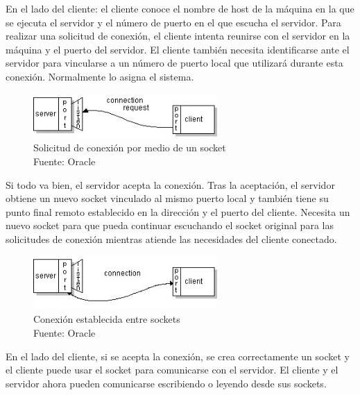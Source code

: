 En el lado del cliente: el cliente conoce el nombre de host de la máquina en la que se ejecuta el servidor y el número de puerto en el que escucha el servidor. Para realizar una solicitud de conexión, el cliente intenta reunirse con el servidor en la máquina y el puerto del servidor. El cliente también necesita identificarse ante el servidor para vincularse a un número de puerto local que utilizará durante esta conexión. Normalmente lo asigna el sistema.

\begin{figure}[H]
    \begin{center}
        \includegraphics[width=7cm]{img/capitulo_2/socket_request.jpg}
    \end{center}
    \caption{Solicitud de conexión por medio de un socket\\Fuente: Oracle}
    \label{fig:tcp_flow}
\end{figure}

Si todo va bien, el servidor acepta la conexión. Tras la aceptación, el servidor obtiene un nuevo socket vinculado al mismo puerto local y también tiene su punto final remoto establecido en la dirección y el puerto del cliente. Necesita un nuevo socket para que pueda continuar escuchando el socket original para las solicitudes de conexión mientras atiende las necesidades del cliente conectado.

\begin{figure}[H]
    \begin{center}
        \includegraphics[width=7cm]{img/capitulo_2/socket_connection.jpg}
    \end{center}
    \caption{Conexión establecida entre sockets\\Fuente: Oracle}
    \label{fig:tcp_flow}
\end{figure}

En el lado del cliente, si se acepta la conexión, se crea correctamente un socket y el cliente puede usar el socket para comunicarse con el servidor. El cliente y el servidor ahora pueden comunicarse escribiendo o leyendo desde sus sockets.

